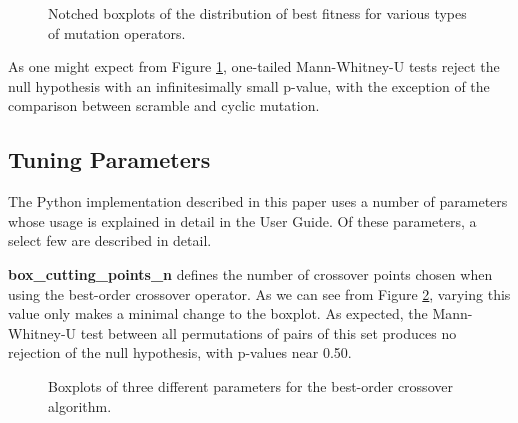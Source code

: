 \documentclass[12pt,twocolumn,oneside]{osajnl}
\begin{document}
\begin{figure}[htbp]
\centering
{}
\caption{Notched boxplots of the distribution of best fitness for various types of mutation operators.}
\label{fig:bpm}
\end{figure}

As one might expect from Figure \ref{fig:bpm}, one-tailed Mann-Whitney-U tests reject the null hypothesis with an infinitesimally small p-value, with the exception of the comparison between scramble and cyclic mutation.

\subsection{Tuning Parameters}
The Python implementation described in this paper uses a number of parameters whose usage is explained in detail in the User Guide. Of these parameters, a select few are described in detail.

\textbf{box\_cutting\_points\_n} defines the number of crossover points chosen when using the best-order crossover operator. As we can see from Figure \ref{fig:boci}, varying this value only makes a minimal change to the boxplot. As expected, the Mann-Whitney-U test between all permutations of pairs of this set produces no rejection of the null hypothesis, with p-values near 0.50.
\begin{figure}[htbp]
\centering
{}
\caption{Boxplots of three different parameters for the best-order crossover algorithm.}
\label{fig:boci}
\end{figure}
\end{document}
